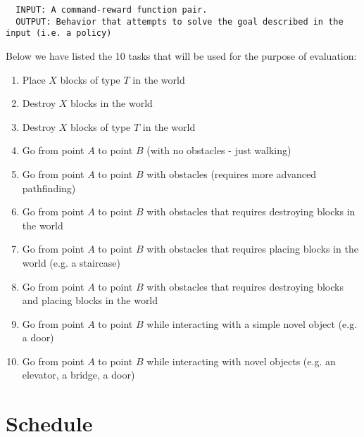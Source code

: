 \documentclass[a4paper]{article}
\begin{document}
\begin{verbatim}
  INPUT: A command-reward function pair.
  OUTPUT: Behavior that attempts to solve the goal described in the input (i.e. a policy)
\end{verbatim}

\hspace{ -5 mm}Below we have listed the 10 tasks that will be used for the purpose of evaluation:

\begin{enumerate}
\item Place $X$ blocks of type $T$ in the world
\item Destroy $X$ blocks in the world
\item Destroy $X$ blocks of type $T$ in the world
\item Go from point $A$ to point $B$ (with no obstacles - just walking)
\item Go from point $A$ to point $B$ with obstacles (requires more advanced pathfinding)
\item Go from point $A$ to point $B$ with obstacles that requires destroying blocks in the world
\item Go from point $A$ to point $B$ with obstacles that requires placing blocks in the world (e.g. a staircase)
\item Go from point $A$ to point $B$ with obstacles that requires destroying blocks and placing blocks in the world
\item Go from point $A$ to point $B$ while interacting with a simple novel object (e.g. a door)
\item Go from point $A$ to point $B$ while interacting with novel objects (e.g. an elevator, a bridge, a door)
\end{enumerate}

\section{Schedule}
\end{document}
